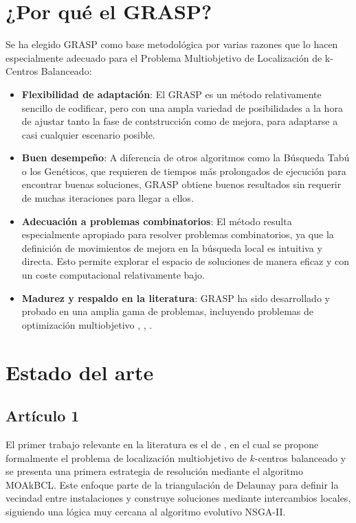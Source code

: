 \documentclass[12pt,a4paper]{book}
\begin{document}
\section{¿Por qué el GRASP?}
Se ha elegido GRASP como base metodológica por varias razones que lo hacen especialmente adecuado para el Problema Multiobjetivo de Localización de k-Centros Balanceado:
\begin{itemize}
    \item \textbf{Flexibilidad de adaptación}: El GRASP es un método relativamente sencillo de codificar, pero con una ampla variedad de posibilidades
    a la hora de ajustar tanto la fase de contstrucción como de mejora, para adaptarse a casi cualquier escenario posible. 
    \item \textbf{Buen desempeño}: A diferencia de otros algoritmos como la Búsqueda Tabú o los Genéticos, que requieren de tiempos más prolongados de ejecución para encontrar buenas soluciones,
    GRASP obtiene buenos resultados sin requerir de muchas iteraciones para llegar a ellos.
    \item \textbf{Adecuación a problemas combinatorios}: El método resulta especialmente apropiado para resolver problemas combinatorios, ya que la definición de movimientos de mejora en la búsqueda local es intuitiva y directa.
    Esto permite explorar el espacio de soluciones de manera eficaz y con un coste computacional relativamente bajo.
    \item \textbf{Madurez y respaldo en la literatura}: GRASP ha sido desarrollado y probado en una amplia gama de problemas, incluyendo problemas de optimización multiobjetivo \cite{grasp_1}, \cite{grasp_3}, \cite{grasp_2}. 
\end{itemize}

\section{Estado del arte}

\subsection{Artículo 1}
El primer trabajo relevante en la literatura es el de \citet{k-balanced_1}, en el cual se propone formalmente el problema de localización multiobjetivo de $k$-centros balanceado y se presenta una primera estrategia de resolución mediante el algoritmo MOAkBCL.
Este enfoque parte de la triangulación de Delaunay \cite{delaunay} para definir la vecindad entre instalaciones y construye soluciones mediante intercambios locales, siguiendo una lógica muy cercana al algoritmo evolutivo NSGA-II.
\end{document}
